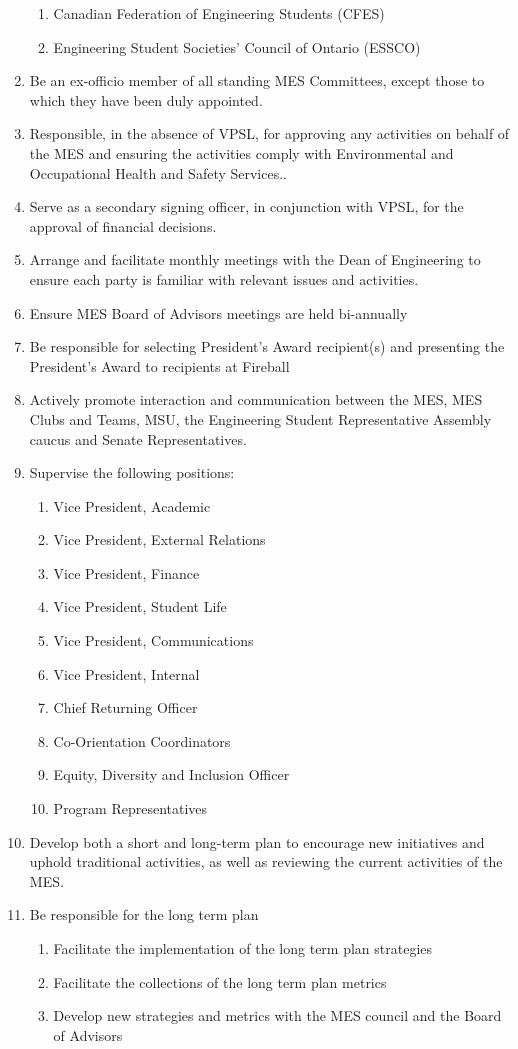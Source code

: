 \begin{enumerate}
  \begin{enumerate}
   \item
    Canadian Federation of Engineering Students (CFES)
   \item
    Engineering Student Societies' Council of Ontario (ESSCO)
  \end{enumerate}
 \item
  Be an ex-officio member of all standing MES Committees, except those
  to which they have been duly appointed.
 \item
  Responsible, in the absence of VPSL, for approving any activities on
  behalf of the MES and ensuring the activities comply with
  Environmental and Occupational Health and Safety Services..
 \item
  Serve as a secondary signing officer, in conjunction with VPSL, for
  the approval of financial decisions.
 \item
  Arrange and facilitate monthly meetings with the Dean of Engineering
  to ensure each party is familiar with relevant issues and activities.
 \item
  Ensure MES Board of Advisors meetings are held bi-annually
 \item
  Be responsible for selecting President's Award recipient(s) and
  presenting the President's Award to recipients at Fireball
 \item
  Actively promote interaction and communication between the MES, MES
  Clubs and Teams, MSU, the Engineering Student Representative Assembly
  caucus and Senate Representatives.
 \item
  Supervise the following positions:

  \begin{enumerate}
   \item
    Vice President, Academic
   \item
    Vice President, External Relations
   \item
    Vice President, Finance
   \item
    Vice President, Student Life
   \item
    Vice President, Communications
   \item
    Vice President, Internal
   \item
    Chief Returning Officer
   \item
    Co-Orientation Coordinators
   \item
    Equity, Diversity and Inclusion Officer
   \item
    Program Representatives
  \end{enumerate}
 \item
  Develop both a short and long-term plan to encourage new initiatives
  and uphold traditional activities, as well as reviewing the current
  activities of the MES.
 \item
  Be responsible for the long term plan

  \begin{enumerate}
   \item
    Facilitate the implementation of the long term plan strategies
   \item
    Facilitate the collections of the long term plan metrics
   \item
    Develop new strategies and metrics with the MES council and the
    Board of Advisors
  \end{enumerate}
\end{enumerate}